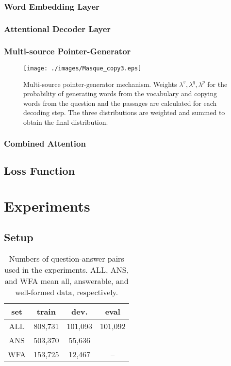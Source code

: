 \documentclass[11pt,a4paper]{article}
\theoremstyle{mydef}
\theoremstyle{myprob}
\begin{document}
\subsubsection{Word Embedding Layer}

\subsubsection{Attentional Decoder Layer}

\subsubsection{Multi-source Pointer-Generator}

\begin{figure}[t!]
\centering
\texttt{[image: ./images/Masque\_copy3.eps]}
\caption{Multi-source pointer-generator mechanism. Weights $\lambda^v, \lambda^q, \lambda^p$ for the probability of generating words from the vocabulary and copying words from the question and the passages are calculated for each decoding step. The three distributions are weighted and summed to obtain the final distribution.}
\label{fig:copy}
\end{figure}

\subsubsection{Combined Attention}

\subsection{Loss Function}

\section{Experiments}

\subsection{Setup}

\begin{table}[t!]
\centering
{\small \tabcolsep=5pt
\begin{tabular}{c|ccc}
\hline
set   & train & dev. & eval \\ \hline
ALL & 808,731 & 101,093 & 101,092\\
ANS & 503,370 & 55,636 & --\\
WFA & 153,725 & 12,467 & --\\
\hline
\end{tabular} \\
}
\caption{Numbers of question-answer pairs used in the experiments. ALL, ANS, and WFA mean all, answerable, and well-formed data, respectively.}
\label{tb:data}
\end{table}
\end{document}
